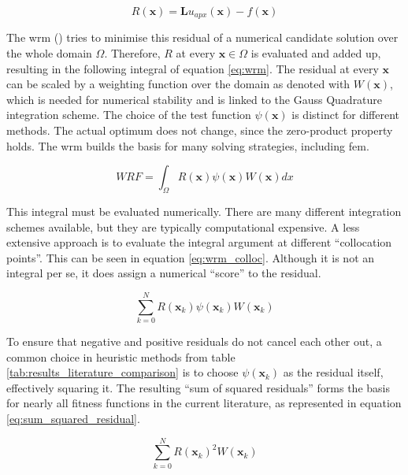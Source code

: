 \documentclass[./\jobname.tex]{subfiles}
\begin{document}
\begin{equation}
\label{eq:residual}
R(\mathbf{x}) = \mathbf{L}u_{apx}(\mathbf{x}) - f(\mathbf{x})
\end{equation}

The \gls{wrm} (\cite{shen_spectral_2011}) tries to minimise this residual of a numerical candidate solution over the whole domain $\Omega$. Therefore, $R$ at every $\mathbf{x} \in \Omega$ is evaluated and added up, resulting in the following integral of equation \eqref{eq:wrm}. The residual at every $\mathbf{x}$ can be scaled by a weighting function over the domain as denoted with $W(\mathbf{x})$, which is needed for numerical stability and is linked to the Gauss Quadrature integration scheme. The choice of the test function $\psi(\mathbf{x})$ is distinct for different methods. The actual optimum does not change, since the zero-product property holds. The \gls{wrm} builds the basis for many solving strategies, including \gls{fem}. 

\begin{equation}
\label{eq:wrm}
WRF = \int_{\Omega} R(\mathbf{x}) \psi(\mathbf{x}) W(\mathbf{x}) dx
\end{equation}

This integral must be evaluated numerically. There are many different integration schemes available, but they are typically computational expensive. A less extensive approach is to evaluate the integral argument at different ``collocation points''. This can be seen in equation \eqref{eq:wrm_colloc}. Although it is not an integral per se, it does assign a numerical ``score'' to the residual. 

\begin{equation}
\label{eq:wrm_colloc}
\sum_{k=0}^{N} R(\mathbf{x}_k) \psi(\mathbf{x}_k) W(\mathbf{x}_k)
\end{equation}

To ensure that negative and positive residuals do not cancel each other out, a common choice in heuristic methods from table \ref{tab:results_literature_comparison} is to choose $\psi(\mathbf{x}_k)$ as the residual itself, effectively squaring it. The resulting ``sum of squared residuals'' forms the basis for nearly all fitness functions in the current literature, as represented in equation \eqref{eq:sum_squared_residual}.

\begin{equation}
\label{eq:sum_squared_residual}
\sum_{k=0}^{N} R(\mathbf{x}_k)^2 W(\mathbf{x}_k)
\end{equation}
\end{document}
